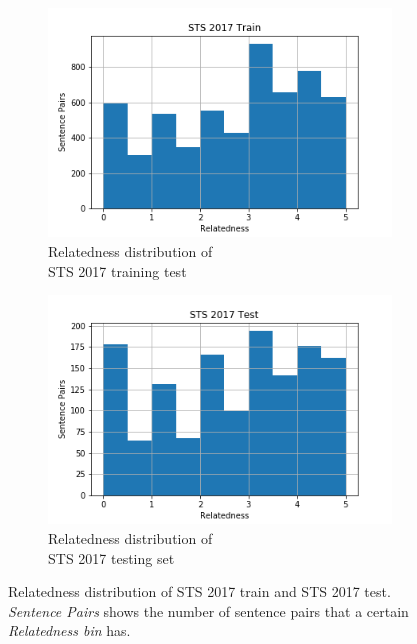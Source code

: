 \begin{enumerate}
\begin{figure}
	\captionsetup[subfigure]{justification=centering}
	\centering
	\begin{subfigure}[b]{.5\textwidth}
		\centering
		\includegraphics[width=\textwidth]{figures/semantic_textual_similarity/introduction/sts_train.png}
		\caption{Relatedness distribution of \\ STS 2017 training test}
		\label{fig:sts_train_relatedness}
	\end{subfigure}%
	\begin{subfigure}[b]{.5\textwidth}
		\centering
		\includegraphics[width=\textwidth]{figures/semantic_textual_similarity/introduction/sts_test.png}
		\caption{Relatedness distribution of \\ STS 2017 testing set}
		\label{fig:sts_test_relatedness}
	\end{subfigure}
	\caption[Relatedness distribution of STS 2017 train and STS 2017 test]{Relatedness distribution of STS 2017 train and STS 2017 test. \textit{Sentence Pairs} shows the number of sentence pairs that a certain \textit{Relatedness bin} has.}
	\label{fig:sts_relatedness}
\end{figure}


\end{enumerate}
